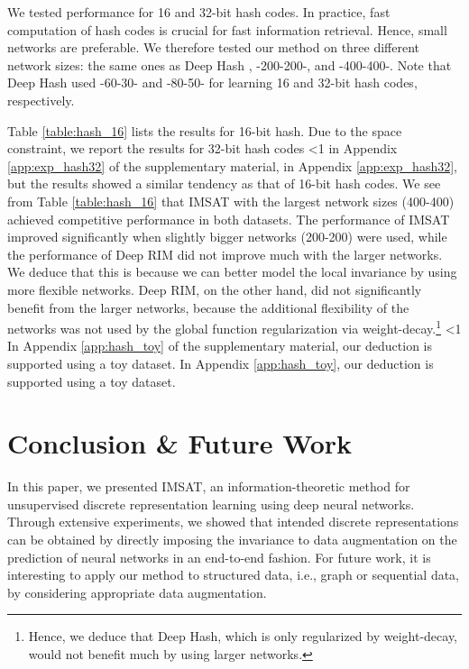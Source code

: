 \documentclass{article}
\theoremstyle{plain}
\newcounter{long}
\begin{document}
We tested performance for 16 and 32-bit hash codes.
In practice, fast computation of hash codes is crucial for fast information retrieval. Hence, small networks are preferable.
We therefore tested our method on three different network sizes: the same ones as Deep Hash \citep{erin2015deep}, -200-200-, and -400-400-. Note that Deep Hash used -60-30- and -80-50- for learning 16 and 32-bit hash codes, respectively.

Table \ref{table:hash_16} lists the results for 16-bit hash.
Due to the space constraint, we report the results for 32-bit hash codes 
\ifnum\value{long}<1
in Appendix \ref{app:exp_hash32} of the supplementary material,
\else
in Appendix \ref{app:exp_hash32},
\fi
but the results showed a similar tendency as that of 16-bit hash codes. We see from Table \ref{table:hash_16} that IMSAT with the largest network sizes (400-400) achieved competitive performance in both datasets. The performance of IMSAT improved significantly when slightly bigger networks (200-200) were used, while the performance of Deep RIM did not improve much with the larger networks. We deduce that this is because we can better model the local invariance by using more flexible networks. 
Deep RIM, on the other hand, did not significantly benefit from the larger networks, because the additional flexibility of the networks was not used by the global function regularization via weight-decay.\footnote{Hence, we deduce that Deep Hash, which is only regularized by weight-decay, would not benefit much by using larger networks.} 
\ifnum\value{long}<1
In Appendix \ref{app:hash_toy} of the supplementary material, our deduction is supported using a toy dataset.
\else
In Appendix \ref{app:hash_toy}, our deduction is supported using a toy dataset.
\fi


\vspace{-0.2cm}
\section{Conclusion \& Future Work}\label{sec:conclusion}
In this paper, we presented IMSAT, an information-theoretic method for unsupervised discrete representation learning using deep neural networks. 
Through extensive experiments, we showed that intended discrete representations can be obtained by directly imposing the invariance to data augmentation on the prediction of neural networks in an end-to-end fashion. For future work, it is interesting to apply our method to structured data, i.e., graph or sequential data, by considering appropriate data augmentation.
\vspace{-0.2cm}
\end{document}
